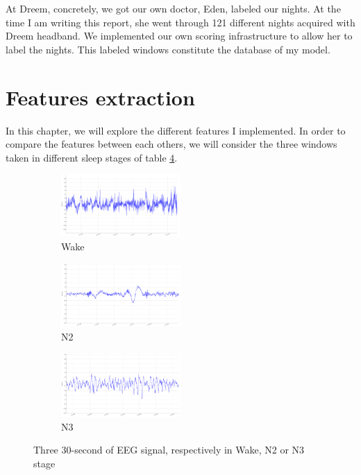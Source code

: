 \documentclass[12pt]{report}
\begin{document}
At Dreem, concretely, we got our own doctor, Eden, labeled our nights. At the time I am writing this report, she went through 121 different nights acquired with Dreem headband. We implemented our own scoring infrastructure to allow her to label the nights. This labeled windows constitute the database of my model.

\newpage
\section{Features extraction}

In this chapter, we will explore the different features I implemented. In order to compare the features between each others, we will consider the three windows taken in different sleep stages of table \ref{fig:3windows}.

\begin{figure}[H]
\begin{subfigure}{1.\textwidth}
	\centering
	\includegraphics[width=0.5\textwidth]{img/chap2/wake_window.png}
	\caption{Wake}
	\label{fig:wake_window}
\end{subfigure}

\begin{subfigure}{1.\textwidth}
	\centering
	\includegraphics[width=0.5\textwidth]{img/chap2/n2_window.png}
	\caption{N2}
	\label{fig:n2_window}
\end{subfigure}

\begin{subfigure}{1.\textwidth}
	\centering
	\includegraphics[width=0.5\textwidth]{img/chap2/n3_window.png}
	\caption{N3}
	\label{fig:n3_window}
\end{subfigure}

\caption{\label{fig:3windows}Three 30-second of EEG signal, respectively in Wake, N2 or N3 stage}
\end{figure}
\end{document}
